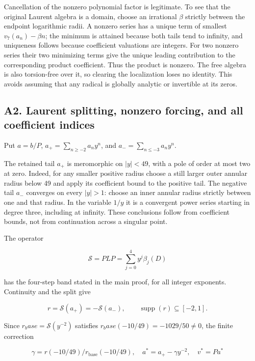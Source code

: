 \documentclass[11pt,a4paper]{article}
\begin{document}
Cancellation of the nonzero polynomial factor is legitimate. To see that the original Laurent algebra is a domain, choose an irrational \(β\) strictly between the endpoint logarithmic radii. A nonzero series has a unique term of smallest \(v_{7}(a_n)-βn\); the minimum is attained because both tails tend to infinity, and uniqueness follows because coefficient valuations are integers. For two nonzero series their two minimizing terms give the unique leading contribution to the corresponding product coefficient. Thus the product is nonzero. The free algebra is also torsion-free over it, so clearing the localization loses no identity. This avoids assuming that any radical is globally analytic or invertible at its zeros.

\hypertarget{a2.-laurent-splitting-nonzero-forcing-and-all-coefficient-indices}{%
\subsection{A2. Laurent splitting, nonzero forcing, and all coefficient indices}\label{a2.-laurent-splitting-nonzero-forcing-and-all-coefficient-indices}}

Put \(a=b/P\), \(a_{+}=\sum _{n≥-2}a_n y^n\), and \(a_{-}=\sum _{n≤-3}a_n y^n\).

The retained tail \(a_{+}\) is meromorphic on \(|y|<49\), with a pole of order at most two at zero. Indeed, for any smaller positive radius choose a still larger outer annular radius below 49 and apply its coefficient bound to the positive tail. The negative tail \(a_{-}\) converges on every \(|y|>1\): choose an inner annular radius strictly between one and that radius. In the variable \(1/y\) it is a convergent power series starting in degree three, including at infinity. These conclusions follow from coefficient bounds, not from continuation across a singular point.

The operator

\[
\mathcal S=P L P=\sum_{j=0}^4 y^j\beta_j(D)
\]

has the four-step band stated in the main proof, for all integer exponents. Continuity and the split give

\[
r=\mathcal S(a_+)=-\mathcal S(a_-),\qquad
\operatorname{supp}(r)\subseteq[-2,1].
\]

Since \(r_base=\mathcal{S}(y^{-2})\) satisfies \(r_base(-10/49)=-1029/50≠0\), the finite correction

\[
\gamma=r(-10/49)/r_{\mathrm{base}}(-10/49),\quad
a^*=a_+-\gamma y^{-2},\quad v^*=Pa^*
\]
\end{document}
